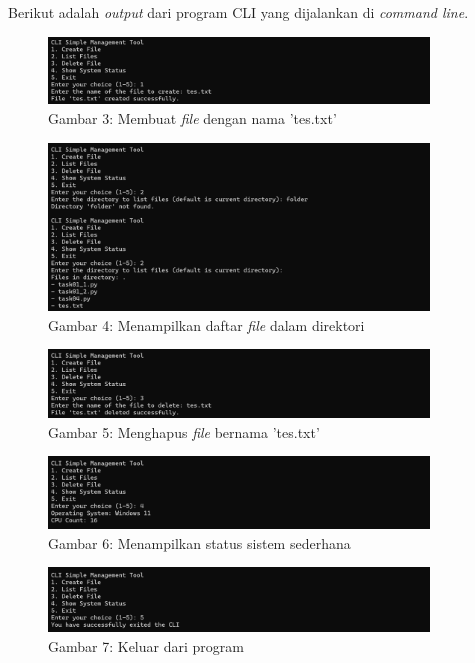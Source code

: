 \documentclass[12pt]{article}
\begin{document}
        \noindent Berikut adalah \textit{output} dari program CLI yang dijalankan di \textit{command line}.
        \begin{figure}[htbp]
            \centering
            \includegraphics[width=0.9\textwidth]{asset/a4-output-1.png}
            \caption{Gambar 3: Membuat \textit{file} dengan nama 'tes.txt'}
            \label{fig:a4-output-1}
        \end{figure}
        \begin{figure}[htbp]
            \centering
            \includegraphics[width=0.9\textwidth]{asset/a4-output-2.png}
            \caption{Gambar 4: Menampilkan daftar \textit{file} dalam direktori}
            \label{fig:a4-output-2}
        \end{figure}
        \begin{figure}[htbp]
            \centering
            \includegraphics[width=0.9\textwidth]{asset/a4-output-3.png}
            \caption{Gambar 5: Menghapus \textit{file} bernama 'tes.txt'}
            \label{fig:a4-output-3}
        \end{figure}
        \begin{figure}[htbp]
            \centering
            \includegraphics[width=0.9\textwidth]{asset/a4-output-4.png}
            \caption{Gambar 6: Menampilkan status sistem sederhana}
            \label{fig:a4-output-4}
        \end{figure}
        \begin{figure}[htbp]
            \centering
            \includegraphics[width=0.9\textwidth]{asset/a4-output-5.png}
            \caption{Gambar 7: Keluar dari program}
            \label{fig:a4-output-5}
        \end{figure}
\end{document}
